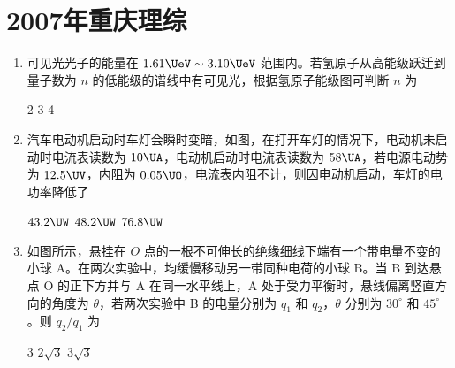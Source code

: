 \documentclass[\gkver]{gaokaozhenti}
\begin{document}
\chapter{2007年重庆理综}

\begin{enumerate}
\item
可见光光子的能量在 $1.61\UeV\sim3.10\UeV$ 范围内。若氢原子从高能级跃迁到量子数为 $n$ 的低能级的谱线中有可见光，根据氢原子能级图可判断 $n$ 为


{2}
{3}
{4}


\item
汽车电动机启动时车灯会瞬时变暗，如图，在打开车灯的情况下，电动机未启动时电流表读数为 $10\UA$，电动机启动时电流表读数为 $58\UA$，若电源电动势为 $12.5\UV$，内阻为 $0.05\UO$，电流表内阻不计，则因电动机启动，车灯的电功率降低了


\fourchoices[answer=B]
{$35.8\UW$}
{$43.2\UW$}
{$48.2\UW$}
{$76.8\UW$}


\item
如图所示，悬挂在 $O$ 点的一根不可伸长的绝缘细线下端有一个带电量不变的小球 A。在两次实验中，均缓慢移动另一带同种电荷的小球 B。当 B 到达悬点 O 的正下方并与 A 在同一水平线上，A 处于受力平衡时，悬线偏离竖直方向的角度为 $\theta$，若两次实验中 B 的电量分别为 $q_{1}$ 和 $q_{2}$，$\theta$ 分别为 $30^{\circ}$ 和 $45^{\circ}$。则 $q_{2}/q_{1}$ 为


{3}
{$2\sqrt{3}$}
{$3\sqrt{3}$}


\end{enumerate}
\end{document}
